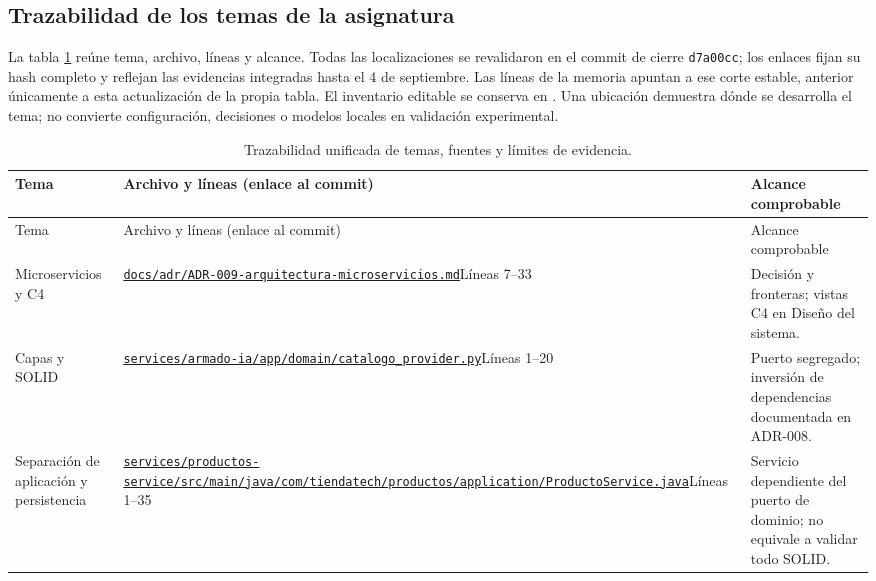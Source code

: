 \subsection{Trazabilidad de los temas de la asignatura}
La tabla \ref{tab:temas} reúne tema, archivo, líneas y alcance. Todas las localizaciones se revalidaron en el commit de cierre \texttt{d7a00cc}; los enlaces fijan su hash completo y reflejan las evidencias integradas hasta el 4 de septiembre. Las líneas de la memoria apuntan a ese corte estable, anterior únicamente a esta actualización de la propia tabla. El inventario editable se conserva en . Una ubicación demuestra dónde se desarrolla el tema; no convierte configuración, decisiones o modelos locales en validación experimental.

{\footnotesize\setlength{\tabcolsep}{4pt}
\begin{longtable}{>{\raggedright\arraybackslash}p{2.5cm}>{\raggedright\arraybackslash}p{6.7cm}>{\raggedright\arraybackslash}p{5.2cm}}
\caption{Trazabilidad unificada de temas, fuentes y límites de evidencia.}\label{tab:temas}\\
\toprule Tema & Archivo y líneas (enlace al commit) & Alcance comprobable\\\midrule\endfirsthead
\toprule Tema & Archivo y líneas (enlace al commit) & Alcance comprobable\\\midrule\endhead
Microservicios y C4 & \href{https://github.com/JoseLozanoMorales/TiendaTech/blob/d7a00ccf6d8ac5def08ff52f7d2880f869667b0b/docs/adr/ADR-009-arquitectura-microservicios.md\#L7-L33}{\nolinkurl{docs/adr/ADR-009-arquitectura-microservicios.md}}\newline Líneas 7--33 & Decisión y fronteras; vistas C4 en Diseño del sistema.\\
Capas y SOLID & \href{https://github.com/JoseLozanoMorales/TiendaTech/blob/d7a00ccf6d8ac5def08ff52f7d2880f869667b0b/services/armado-ia/app/domain/catalogo_provider.py\#L1-L20}{\nolinkurl{services/armado-ia/app/domain/catalogo_provider.py}}\newline Líneas 1--20 & Puerto segregado; inversión de dependencias documentada en ADR-008.\\
Separación de aplicación y persistencia & \href{https://github.com/JoseLozanoMorales/TiendaTech/blob/d7a00ccf6d8ac5def08ff52f7d2880f869667b0b/services/productos-service/src/main/java/com/tiendatech/productos/application/ProductoService.java\#L1-L35}{\nolinkurl{services/productos-service/src/main/java/com/tiendatech/productos/application/ProductoService.java}}\newline Líneas 1--35 & Servicio dependiente del puerto de dominio; no equivale a validar todo SOLID.\\

\end{longtable}}
